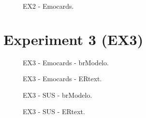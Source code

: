 \begin{apendicesenv}
\newpage

\begin{figure}
    \centering
    
    \caption{EX2 - Emocards.}
    \label{fig:ex2Emocards}
\end{figure}



\chapter{Experiment 3 (EX3)}

\begin{figure}
    \centering
    
    \caption{EX3 - Emocards - brModelo.}
    \label{fig:ex3EmocardsbrModelo}
\end{figure}

\newpage

\begin{figure}
    \centering
    
    \caption{EX3 - Emocards - ERtext.}
    \label{fig:ex3EmocardsERtext}
\end{figure}

\newpage

\begin{figure}
    \centering
    
    \caption{EX3 - SUS - brModelo.}
    \label{fig:ex3EmocardsERtext}
\end{figure}

\newpage

\begin{figure}
    \centering
    
    \caption{EX3 - SUS - ERtext.}
    \label{fig:ex3EmocardsERtext}
\end{figure}

\end{apendicesenv}
